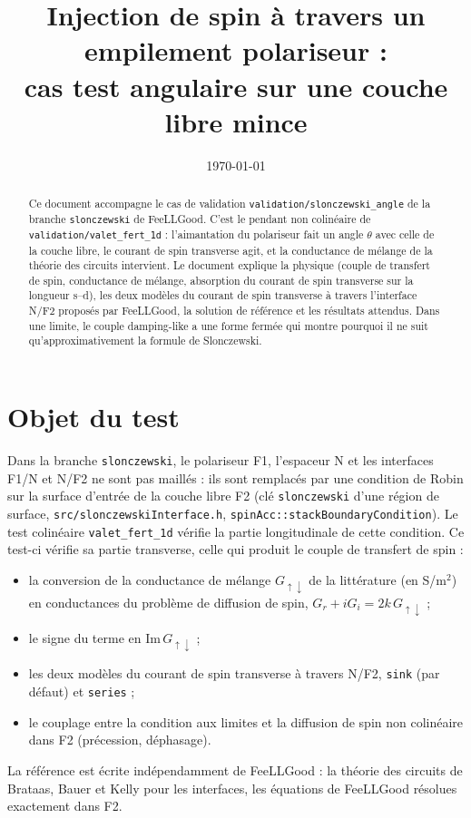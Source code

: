 \documentclass[11pt,a4paper]{article}
\title{Injection de spin à travers un empilement polariseur :\\
  cas test angulaire sur une couche libre mince}
\author{}
\date{\today}
\begin{document}
\maketitle

\begin{abstract}
  Ce document accompagne le cas de validation
  \texttt{validation/slonczewski\_angle} de la branche \texttt{slonczewski}
  de FeeLLGood. C'est le pendant non colinéaire de
  \texttt{validation/valet\_fert\_1d} : l'aimantation du polariseur fait un
  angle $\theta$ avec celle de la couche libre, le courant de spin
  transverse agit, et la conductance de mélange de la théorie des circuits
  intervient. Le document explique la physique (couple de transfert de
  spin, conductance de mélange, absorption du courant de spin transverse
  sur la longueur s--d), les deux modèles du courant de spin transverse à
  travers l'interface N/F2 proposés par FeeLLGood, la solution de
  référence et les résultats attendus. Dans une limite, le couple
  damping-like a une forme fermée qui montre pourquoi il ne suit
  qu'approximativement la formule de Slonczewski.
\end{abstract}

\tableofcontents

\section{Objet du test}

Dans la branche \texttt{slonczewski}, le polariseur F1, l'espaceur N et les
interfaces F1/N et N/F2 ne sont pas maillés : ils sont remplacés par une
condition de Robin sur la surface d'entrée de la couche libre F2 (clé
\texttt{slonczewski} d'une région de surface,
\texttt{src/slonczewskiInterface.h},
\texttt{spinAcc::stackBoundaryCondition}). Le test colinéaire
\texttt{valet\_fert\_1d} vérifie la partie longitudinale de cette
condition. Ce test-ci vérifie sa partie transverse, celle qui produit le
couple de transfert de spin :
\begin{itemize}
  \item la conversion de la conductance de mélange $G_{\uparrow\downarrow}$
    de la littérature (en S/m$^2$) en conductances du problème de
    diffusion de spin, $G_r + iG_i = 2k\,G_{\uparrow\downarrow}$ ;
  \item le signe du terme en $\mathrm{Im}\,G_{\uparrow\downarrow}$ ;
  \item les deux modèles du courant de spin transverse à travers N/F2,
    \texttt{sink} (par défaut) et \texttt{series} ;
  \item le couplage entre la condition aux limites et la diffusion de spin
    non colinéaire dans F2 (précession, déphasage).
\end{itemize}
La référence est écrite indépendamment de FeeLLGood : la théorie des
circuits de Brataas, Bauer et Kelly pour les interfaces, les équations de
FeeLLGood résolues exactement dans F2.
\end{document}
